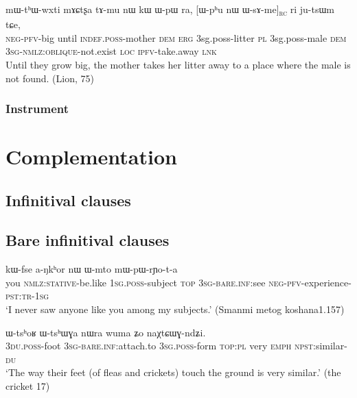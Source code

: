 \documentclass[oldfontcommands,oneside,a4paper,11pt]{article}
\newcommand{\ipa}[1]{{\phon #1}} %
\newcommand{\topic}{\textsc{dem}}
\newcommand{\rc}{\textsubscript{\textsc{rc}}}
\begin{document}
\begin{exe}
   \ex \label{ex:WsAme}
 \gll
\ipa{mɯ-tʰɯ-wxti}   	\ipa{mɤɕtʂa}   	\ipa{tɤ-mu}   	\ipa{nɯ}   	\ipa{kɯ}   	\ipa{ɯ-pɯ}   	\ipa{ra,}   	[\ipa{ɯ-pʰu}   	\ipa{nɯ}   	\ipa{ɯ-sɤ-me}]\rc{}   	\ipa{ri}   	\ipa{ju-tsɯm}   	\ipa{tɕe,}   \\
\textsc{neg-pfv}-big until \textsc{indef.poss}-mother \topic{} \textsc{erg}  {3sg.poss}-litter \textsc{pl}  {3sg.poss}-male \topic{} \textsc{3sg-nmlz:oblique}-not.exist  \textsc{loc} \textsc{ipfv}-take.away \textsc{lnk} \\
\glt  Until they grow big, the mother takes her litter away to a place where the male is not found. (Lion, 75)
  \end{exe}
\subsubsection{Instrument}


\section{Complementation} \label{sec:complement}
\citet{jacques15causative}
\citet{sun12complementation}

\subsection{Infinitival clauses} \label{sec:inf1}

\subsection{Bare infinitival clauses} \label{sec:inf2}


\begin{exe}
\ex \label{ex:bare.inf}
\gll \ipa{nɤʑo} 	\ipa{kɯ-fse} 	\ipa{a-ŋkʰor} 	\ipa{nɯ} 	\ipa{ɯ-mto} 	\ipa{mɯ-pɯ-rɲo-t-a} \\
you \textsc{nmlz:stative}-be.like \textsc{1sg.poss}-subject \textsc{top} \textsc{3sg}-\textsc{bare.inf:}see \textsc{neg-pfv}-experience-\textsc{pst:tr-1sg} \\
\glt  `I never saw anyone like you among my subjects.' (Smanmi metog koshana1.157)
\end{exe}


\begin{exe}
\ex \label{ex:bare.inf.noun}
\gll \ipa{ndʑi-mi}   	\ipa{ɯ-tsʰoʁ}   	\ipa{ɯ-tsʰɯɣa}   	\ipa{nɯra}   	\ipa{wuma}   	\ipa{ʑo}   	\ipa{naχtɕɯɣ-ndʑi.}   \\
\textsc{3du.poss}-foot \textsc{3sg}-\textsc{bare.inf:}attach.to \textsc{3sg.poss}-form \textsc{top:pl} very \textsc{emph}  \textsc{npst}:similar-\textsc{du}  \\
\glt `The way their feet (of fleas and crickets) touch the ground is very similar.' (the cricket 17)
\end{exe}
\end{document}
